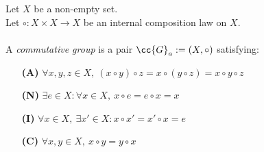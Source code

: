 \begin{definition-pre}
    \label{def:commutative_group}
    Let \(X\) be a non-empty set.\\
    Let \(\circ: X\times X \to X\) be an internal composition law on \(X\). \\\\
    A \textit{commutative group} is a pair \(\cc{G}_a:= (X, \circ)\) satisfying:
    \begin{enumerate}
        \item [\textbf{(A)}] \(\forall x,y,z\in X,\ (x\circ y)\circ z= x\circ (y\circ z) = x\circ y \circ z\)
        \item [\textbf{(N)}] \(\exists e \in X : \forall x \in X,\ x\circ e = e \circ x = x\)
        \item [\textbf{(I)}] \(\forall x \in X,\ \exists x'\in X: x\circ x' = x'\circ x = e\)
        \item [\textbf{(C)}] \(\forall x,y\in X,\ x\circ y = y\circ x\)
    \end{enumerate}
\end{definition-pre}

